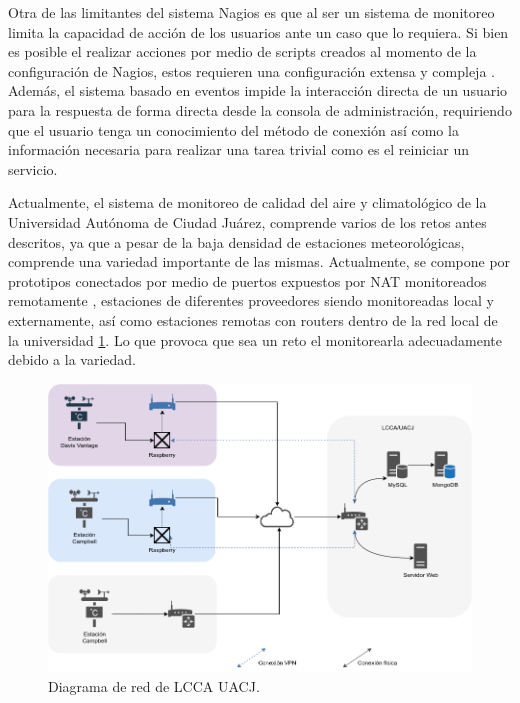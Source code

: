 Otra de las limitantes del sistema Nagios es que al ser un sistema de monitoreo limita la capacidad de acción de los usuarios ante un caso que lo requiera. Si bien es posible el realizar acciones por medio de scripts creados al momento de la configuración de Nagios, estos requieren una configuración extensa y compleja \cite{nagios_service_restart}. Además, el sistema basado en eventos impide la interacción directa de un usuario para la respuesta de forma directa desde la consola de administración, requiriendo que el usuario tenga un conocimiento del método de conexión así como la información necesaria para realizar una tarea trivial como es el reiniciar un servicio.



Actualmente, el sistema de monitoreo de calidad del aire y climatológico de la Universidad Autónoma de Ciudad Juárez, comprende varios de los retos antes descritos, ya que a pesar de la baja densidad de estaciones meteorológicas, comprende una variedad importante de las mismas. Actualmente, se compone por prototipos conectados por medio de puertos expuestos por NAT monitoreados remotamente \cite{red_climatologica_uacj}, estaciones de diferentes proveedores siendo monitoreadas local y externamente, así como estaciones remotas con routers dentro de la red local de la universidad \ref{fig:current_network}. Lo que provoca que sea un reto el monitorearla adecuadamente debido a la variedad.

\begin{figure}[!ht]
	\centering
	\includegraphics[width=.80\linewidth]{images/diagrams/current_network.png}
	\caption{Diagrama de red de LCCA UACJ.}
	\label{fig:current_network}
\end{figure}

